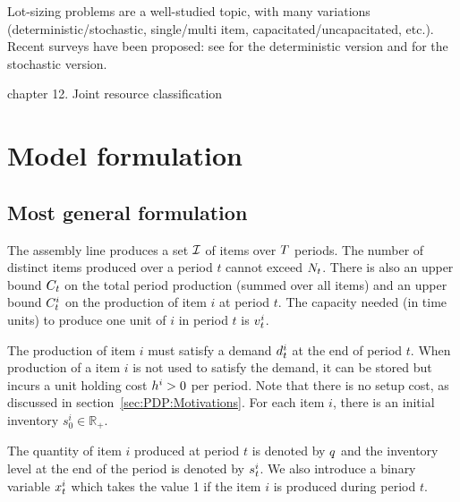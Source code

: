 Lot-sizing problems are a well-studied topic, with many variations (deterministic/stochastic, single/multi item, capacitated/uncapacitated, etc.). Recent surveys have been proposed: see \cite{Gicquel2008,quadt2008capacitated} for the deterministic version and \cite{Mula2006,Aloulou2014,Diaz-Madronero2014} for the stochastic version.


\cite{Pochet2006} chapter 12. Joint resource classification



\section{Model formulation}


\subsection{Most general formulation}

The assembly line produces a set $\mathcal{I}$ of items over $T$ periods. The number of distinct items produced over a period $t$ cannot exceed $N_t$. There is also an upper bound $C_t$ on the total period production (summed over all items) and an upper bound $C_t^i$ on the production of item $i$ at period $t$. The capacity needed (in time units) to produce one unit of $i$ in period $t$ is $v_t^i$.

The production of item $i$ must satisfy a demand $d_t^i$ at the end of period $t$. When production of a item $i$ is not used to satisfy the demand, it can be stored but incurs a unit holding cost $h^i>0$ per period. Note that there is no setup cost, as discussed in section~\ref{sec:PDP:Motivations}. For each item $i$, there is an initial inventory $s_0^i\in\mathbb{R}_+$.

The quantity of item $i$ produced at period $t$ is denoted by $q$ and the inventory level at the end of the period is denoted by $s_t^i$. We also introduce a binary variable $x_t^i$ which takes the value 1 if the item $i$ is produced during period $t$.

